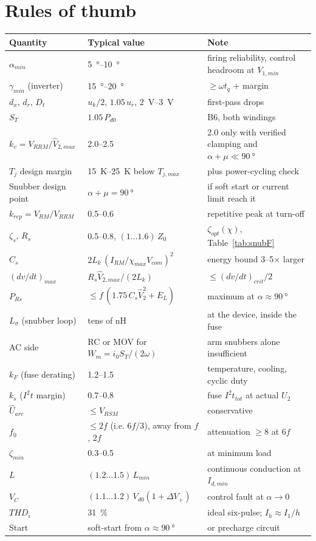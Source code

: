 \documentclass[10pt,a4paper]{scrartcl}
\newcommand{\Vdo}{V_{d0}}
\newcommand{\Lk}{L_{k}}
\newcommand{\uk}{u_{k}}
\newcommand{\ur}{u_{r}}
\newcommand{\Dt}{D_{t}}
\newcommand{\VRRM}{V_{RRM}}
\newcommand{\VRSM}{V_{RSM}}
\newcommand{\iit}{I^{2}t}
\newcommand{\Tj}{T_{j}}
\begin{document}
\section{Rules of thumb}
\begin{center}\small
\begin{tabular}{@{}lll@{}}
\toprule
Quantity & Typical value & Note \\
\midrule
$\alpha_{min}$ & \SIrange{5}{10}{\degree} & firing reliability, control headroom at $V_{1,min}$ \\
$\gamma_{min}$ (inverter) & \SIrange{15}{20}{\degree} & $\ge\omega t_q$ + margin \\
$d_x$, $d_r$, $\Dt$ & $\uk/2$, $1.05\,\ur$, \SIrange{2}{3}{V} & first-pass drops \\
$S_T$ & $1.05\,P_{d0}$ & B6, both windings \\
$k_v = \VRRM/\hat V_{2,max}$ & 2.0--2.5 & 2.0 only with verified clamping and $\alpha+\mu\ll\SI{90}{\degree}$ \\
$\Tj$ design margin & \SIrange{15}{25}{K} below $T_{j,max}$ & plus power-cycling check \\
Snubber design point & $\alpha+\mu = \SI{90}{\degree}$ & if soft start or current limit reach it \\
$k_{rep} = V_{RM}/\VRRM$ & 0.5--0.6 & repetitive peak at turn-off \\
$\zeta_s$, $R_s$ & 0.5--0.8, $(1\ldots1.6)\,Z_0$ & $\zeta_{opt}(\chi)$, Table~\ref{tab:snubF} \\
$C_s$ & $2\Lk\,(I_{RM}/\chi_{max}V_{com})^2$ & energy bound 3--5$\times$ larger \\
$(dv/dt)_{max}$ & $R_s\hat V_{2,max}/(2\Lk)$ & $\le(dv/dt)_{crit}/2$ \\
$P_{Rs}$ & $\le f\,(1.75\,C_s\hat V_2^2 + E_L)$ & maximum at $\alpha\approx\SI{90}{\degree}$ \\
$L_\sigma$ (snubber loop) & tens of nH & at the device, inside the fuse \\
AC side & RC or MOV for $W_m = i_0S_T/(2\omega)$ & arm snubbers alone insufficient \\
$k_F$ (fuse derating) & 1.2--1.5 & temperature, cooling, cyclic duty \\
$k_s$ ($\iit$ margin) & 0.7--0.8 & fuse $\iit_{tot}$ at actual $U_2$ \\
$\hat U_{arc}$ & $\le\VRSM$ & conservative \\
$f_0$ & $\le 2f$ (i.e. $6f/3$), away from $f$, $2f$ & attenuation $\ge 8$ at $6f$ \\
$\zeta_{min}$ & 0.3--0.5 & at minimum load \\
$L$ & $(1.2\ldots1.5)\,L_{min}$ & continuous conduction at $I_{d,min}$ \\
$V_C$ & $(1.1\ldots1.2)\,\Vdo(1+\Delta V_+)$ & control fault at $\alpha\to0$ \\
$THD_i$ & \SI{31}{\percent} & ideal six-pulse; $I_h\approx I_1/h$ \\
Start & soft-start from $\alpha\approx\SI{90}{\degree}$ & or precharge circuit \\
\bottomrule
\end{tabular}
\end{center}
\end{document}
